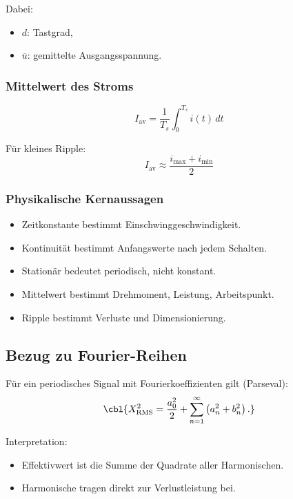 Dabei:
\begin{itemize}
    \item $d$: Tastgrad,
    \item $\overline{u}$: gemittelte Ausgangsspannung.
\end{itemize}


\subsubsection{Mittelwert des Stroms}

\[
\boxed{
I_{\mathrm{av}} = \frac{1}{T_s} \int_0^{T_s} i(t)\, dt
}
\]

Für kleines Ripple:
\[
\boxed{
I_{\mathrm{av}} \approx \frac{i_{\max} + i_{\min}}{2}
}
\]


\subsubsection{Physikalische Kernaussagen}

\begin{itemize}
    \item Zeitkonstante bestimmt Einschwinggeschwindigkeit.
    \item Kontinuität bestimmt Anfangswerte nach jedem Schalten.
    \item Stationär bedeutet periodisch, nicht konstant.
    \item Mittelwert bestimmt Drehmoment, Leistung, Arbeitspunkt.
    \item Ripple bestimmt Verluste und Dimensionierung.
\end{itemize}

\subsection{Bezug zu Fourier-Reihen}

Für ein periodisches Signal mit Fourierkoeffizienten gilt (Parseval):
\[
\cbl{X_{\mathrm{RMS}}^2 = \frac{a_0^2}{2} + \sum_{n=1}^\infty \left( a_n^2 + b_n^2 \right).}
\]

Interpretation:
\begin{itemize}
    \item Effektivwert ist die Summe der Quadrate aller Harmonischen.
    \item Harmonische tragen direkt zur Verlustleistung bei.
\end{itemize}


